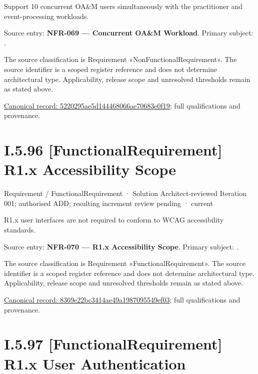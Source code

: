 Support 10 concurrent OA\&M users simultaneously with the practitioner and event-processing workloads.



Source entry: \textbf{NFR-069 — Concurrent OA\&M Workload}. Primary subject: \texttt{}.



The source classification is Requirement «NonFunctionalRequirement». The source identifier is a scoped register reference and does not determine architectural type. Applicability, release scope and unresolved thresholds remain as stated above.


{\footnotesize \href{../../../../../../../../continuum/motivation/requirement/non-functional-requirement/5220295ae5d144468066ae70683e0f19.md}{Canonical record: 5220295ae5d144468066ae70683e0f19}; full qualifications and provenance.}\par
\section*{I.5.96 [FunctionalRequirement] R1.x Accessibility Scope}
\label{navigation:I.5.96}

\label{element:8369e22bc3414ae49a1987095549ef03}
{\small Requirement / FunctionalRequirement · Solution Architect-reviewed Iteration 001; authorised ADD; resulting increment review pending · current}\par

R1.x user interfaces are not required to conform to WCAG accessibility standards.



Source entry: \textbf{NFR-070 — R1.x Accessibility Scope}. Primary subject: \texttt{}.



The source classification is Requirement «FunctionalRequirement». The source identifier is a scoped register reference and does not determine architectural type. Applicability, release scope and unresolved thresholds remain as stated above.


{\footnotesize \href{../../../../../../../../continuum/motivation/requirement/functional-requirement/8369e22bc3414ae49a1987095549ef03.md}{Canonical record: 8369e22bc3414ae49a1987095549ef03}; full qualifications and provenance.}\par
\section*{I.5.97 [FunctionalRequirement] R1.x User Authentication}
\label{navigation:I.5.97}


